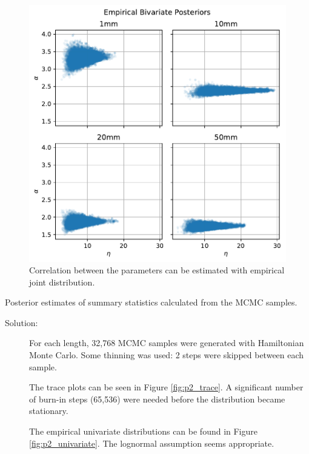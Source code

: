 \documentclass[letterpaper,11pt]{article}
\begin{document}
\begin{enumerate}
\begin{enumerate}
    \begin{figure}
      \centering
      \includegraphics{p2_bivariate.pdf}
      \caption{Correlation between the parameters can be estimated with
        empirical joint distribution.}
      \label{fig:p2_bivariate}
    \end{figure}

    \begin{table}
      \scriptsize
      \centering
      
      \caption{Posterior estimates of summary statistics calculated from the
        MCMC samples.}
      \label{tab:p2_summary}
    \end{table}
    
    \begin{description}
    \item[Solution:] For each length, 32,768 MCMC samples were generated with
      Hamiltonian Monte Carlo. Some thinning was used: 2 steps were skipped
      between each sample.

      The trace plots can be seen in Figure \ref{fig:p2_trace}. A significant
      number of burn-in steps (65,536) were needed before the distribution
      became stationary.

      The empirical univariate distributions can be found in Figure
      \ref{fig:p2_univariate}. The lognormal assumption seems appropriate.


\end{description}
\end{enumerate}
\end{enumerate}
\end{document}
